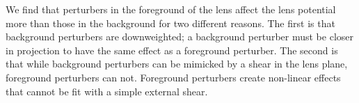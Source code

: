 We find that perturbers in the foreground of the lens affect the lens potential more than those in the background for two different reasons. The first is that background perturbers are downweighted; a background perturber must be closer in projection to have the same effect as a foreground perturber. The second is that while background perturbers can be mimicked by a shear in the lens plane, foreground perturbers can not. Foreground perturbers create non-linear effects that cannot be fit with a simple external shear.